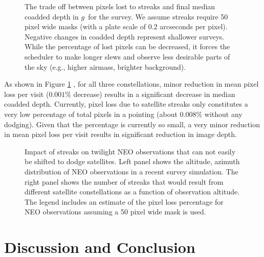\documentclass[linenumbers]{aastex631}
\begin{document}
\begin{figure}[ht!]
\caption{The trade off between pixels lost to streaks and final median coadded depth in $g$\ for the survey.  We assume streaks require 50 pixel wide masks (with a plate scale of 0.2 arcseconds per pixel).  Negative changes in coadded depth represent shallower surveys. While the percentage of lost pixels can be decreased, it forces the scheduler to make longer slews and observe less desirable parts of the sky (e.g., higher airmass, brighter background). \label{fig-trade-off}}
\end{figure}

As shown in Figure \ref{fig-trade-off} , for all three constellations, minor reduction in mean pixel loss per visit ($0.001\%$ decrease) results in a significant decrease in median coadded depth. Currently, pixel loss due to satellite streaks only constitutes a very low percentage of total pixels in a pointing (about $0.008\%$ without any dodging). Given that the percentage is currently so small, a very minor reduction in mean pixel loss per visit results in significant reduction in image depth.

\begin{figure}
    \centering
    \caption{Impact of streaks on twilight NEO observations that can not easily be shifted to dodge satellites. Left panel shows the altitude, azimuth distribution of NEO observations in a recent survey simulation. The right panel shows the number of streaks that would result from different satellite constellations as a function of observation altitude. The legend includes an estimate of the pixel loss percentage for NEO observations assuming a 50 pixel wide mask is used. }
    \label{fig:twi_neo}
\end{figure}


\section{Discussion and Conclusion}
\end{document}
